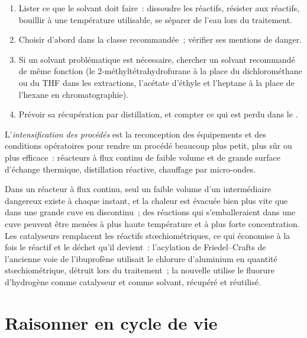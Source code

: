 \begin{method}\label{met:b3:green-industrial:solvent-choice}
\begin{enumerate}
  \item Lister ce que le solvant doit faire~: dissoudre les réactifs,
        résister aux réactifs, bouillir à une température utilisable, se
        séparer de l'eau lors du traitement.
  \item Choisir d'abord dans la classe recommandée~; vérifier ses mentions
        de danger.
  \item Si un solvant problématique est nécessaire, chercher un solvant
        recommandé de même fonction (le 2-méthyltétrahydrofurane à la place
        du dichlorométhane ou du THF dans les extractions, l'acétate
        d'éthyle et l'heptane à la place de l'hexane en chromatographie).
  \item Prévoir sa récupération par distillation, et compter ce qui est
        perdu dans le .
\end{enumerate}
\end{method}

\begin{definition}\label{def:b3:green-industrial:intensification}
L'\emph{intensification des procédés} est la
reconception des équipements et des conditions opératoires pour rendre un
procédé beaucoup plus petit, plus sûr ou plus efficace~: réacteurs à flux
continu de faible volume et de grande surface d'échange thermique,
distillation réactive, chauffage par micro-ondes.
\end{definition}

Dans un réacteur à flux continu, seul un faible volume d'un intermédiaire
dangereux existe à chaque instant, et la chaleur est évacuée bien plus vite
que dans une grande cuve en discontinu~; des réactions qui s'emballeraient
dans une cuve peuvent être menées à plus haute température et à plus forte
concentration. Les catalyseurs remplacent les réactifs stœchiométriques,
ce qui économise à la fois le réactif et le déchet qu'il devient~:
l'acylation de Friedel--Crafts de l'ancienne voie de l'ibuprofène utilisait
le chlorure d'aluminium en quantité stœchiométrique, détruit lors du
traitement~; la nouvelle utilise le fluorure d'hydrogène comme catalyseur
et comme solvant, récupéré et réutilisé.

\section{Raisonner en cycle de vie}

